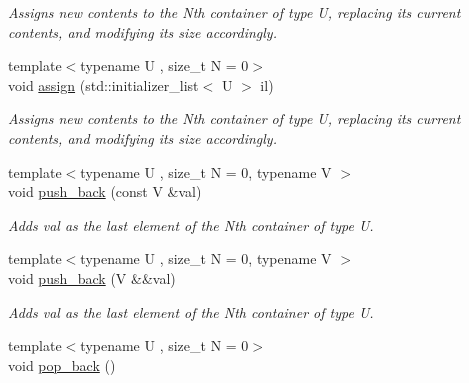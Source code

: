 \begin{DoxyCompactItemize}
\begin{DoxyCompactList}\small\item\em Assigns new contents to the Nth container of type U, replacing its current contents, and modifying its size accordingly. \end{DoxyCompactList}\item 
\hypertarget{classheterogeneous_1_1heterovector_3_01_t_00_01_types_8_8_8_4_a245c11a8ffce512a5d332827bfeb466a}{}{\footnotesize template$<$typename U , size\+\_\+t N = 0$>$ }\\void \hyperlink{classheterogeneous_1_1heterovector_3_01_t_00_01_types_8_8_8_4_a245c11a8ffce512a5d332827bfeb466a}{assign} (std\+::initializer\+\_\+list$<$ U $>$ il)\label{classheterogeneous_1_1heterovector_3_01_t_00_01_types_8_8_8_4_a245c11a8ffce512a5d332827bfeb466a}

\begin{DoxyCompactList}\small\item\em Assigns new contents to the Nth container of type U, replacing its current contents, and modifying its size accordingly. \end{DoxyCompactList}\item 
\hypertarget{classheterogeneous_1_1heterovector_3_01_t_00_01_types_8_8_8_4_ae0341fe7ed3e5cab6e124221e4b2af7d}{}{\footnotesize template$<$typename U , size\+\_\+t N = 0, typename V $>$ }\\void \hyperlink{classheterogeneous_1_1heterovector_3_01_t_00_01_types_8_8_8_4_ae0341fe7ed3e5cab6e124221e4b2af7d}{push\+\_\+back} (const V \&val)\label{classheterogeneous_1_1heterovector_3_01_t_00_01_types_8_8_8_4_ae0341fe7ed3e5cab6e124221e4b2af7d}

\begin{DoxyCompactList}\small\item\em Adds val as the last element of the Nth container of type U. \end{DoxyCompactList}\item 
\hypertarget{classheterogeneous_1_1heterovector_3_01_t_00_01_types_8_8_8_4_a15ea664e8f35ea0b4886d0f084712c28}{}{\footnotesize template$<$typename U , size\+\_\+t N = 0, typename V $>$ }\\void \hyperlink{classheterogeneous_1_1heterovector_3_01_t_00_01_types_8_8_8_4_a15ea664e8f35ea0b4886d0f084712c28}{push\+\_\+back} (V \&\&val)\label{classheterogeneous_1_1heterovector_3_01_t_00_01_types_8_8_8_4_a15ea664e8f35ea0b4886d0f084712c28}

\begin{DoxyCompactList}\small\item\em Adds val as the last element of the Nth container of type U. \end{DoxyCompactList}\item 
\hypertarget{classheterogeneous_1_1heterovector_3_01_t_00_01_types_8_8_8_4_ae2d7139ede11f3542f645d87a349fb31}{}{\footnotesize template$<$typename U , size\+\_\+t N = 0$>$ }\\void \hyperlink{classheterogeneous_1_1heterovector_3_01_t_00_01_types_8_8_8_4_ae2d7139ede11f3542f645d87a349fb31}{pop\+\_\+back} ()\label{classheterogeneous_1_1heterovector_3_01_t_00_01_types_8_8_8_4_ae2d7139ede11f3542f645d87a349fb31}


\end{DoxyCompactItemize}
